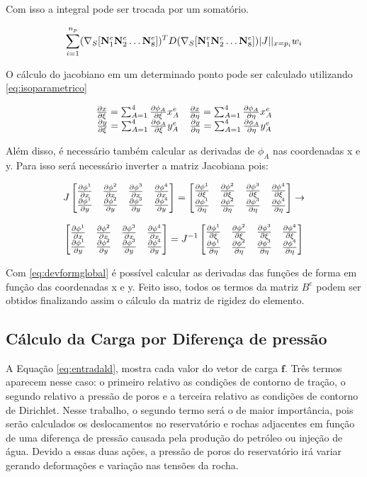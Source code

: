 Com isso a integral pode ser trocada por um somatório.

\begin{equation}
    \sum^{n_p}_{i=1} (\sopnabla [\basefunctionelem[1] \basefunctionelem[2] \hdots \basefunctionelem[8] ]) ^T D (\sopnabla [\basefunctionelem[1] \basefunctionelem[2] \hdots \basefunctionelem[8]])|J||_{x=p_i} w_i
\end{equation}

O cálculo do jacobiano em um determinado ponto pode ser calculado utilizando \eqref{eq:isoparametrico}

\begin{equation}\label{eq:jacobianoderivadas}
\begin{matrix}
\dxi[x] = \sum^4_{A=1} \dxi[\phi_A] x^e_A &  \deta[x] = \sum^4_{A=1} \deta[\phi_A] x^e_A\\
\dxi[y] = \sum^4_{A=1} \dxi[\phi_A] y^e_A &  \deta[y] = \sum^4_{A=1} \deta[\phi_A] y^e_A
\end{matrix}
\end{equation}


Além disso, é necessário também calcular as derivadas de $\phi_A$ nas coordenadas x e y.  Para isso será necessário inverter a matriz Jacobiana pois:


\begin{equation}
J \deriv = \der \rightarrow
\end{equation}

\begin{equation} \label{eq:devformglobal}
     \deriv = J ^{-1}\der
\end{equation}

Com \eqref{eq:devformglobal}  é possível calcular as derivadas das funções de forma em função das coordenadas x e y. Feito isso, todos os termos da matriz $B^e$ podem ser obtidos finalizando assim o cálculo da matriz de rigidez do elemento.



\subsection{Cálculo da Carga por Diferença de pressão}

A Equação \eqref{eq:entradald}, mostra cada valor do vetor de carga $\mathbf{f}$. Três termos aparecem nesse caso: o primeiro relativo as condições de contorno de tração, o segundo relativo a pressão de poros e a terceira relativo as condições de contorno de Dirichlet. Nesse trabalho, o segundo termo será o de maior importância, pois serão calculados os deslocamentos no reservatório e rochas adjacentes em função de uma diferença de pressão causada pela produção do petróleo ou injeção de água. Devido a essas duas ações, a pressão de poros do reservatório irá variar gerando deformações e variação nas tensões da rocha. 

